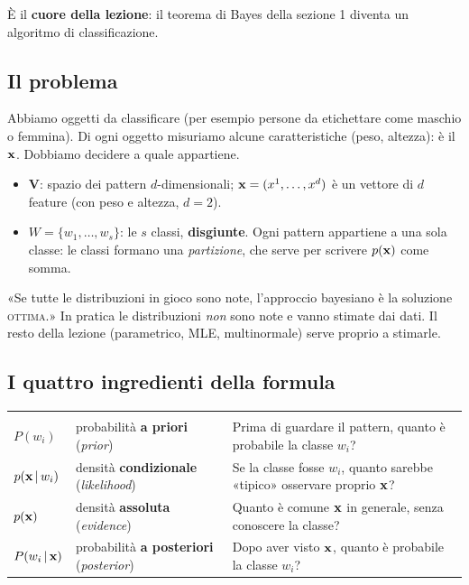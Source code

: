 
È il \textbf{cuore della lezione}: il teorema di Bayes della sezione 1 diventa un algoritmo di classificazione.

\subsection{Il problema}
\begin{intuizione}
Abbiamo oggetti da classificare (per esempio persone da etichettare come maschio o femmina). Di ogni oggetto misuriamo alcune caratteristiche (peso, altezza): è il  $\mathbf{x}$. Dobbiamo decidere a quale  appartiene.
\end{intuizione}
\begin{tecnica}
\begin{itemize}
  \item $\mathbf{V}$: spazio dei pattern $d$-dimensionali; $\mathbf{x}=(x^1,\dots,x^d)$ è un vettore di $d$ feature (con peso e altezza, $d=2$).
  \item $W=\{w_1,\dots,w_s\}$: le $s$ classi, \textbf{disgiunte}. Ogni pattern appartiene a una sola classe: le classi formano una \emph{partizione}, che serve per scrivere $p(\mathbf{x})$ come somma.
\end{itemize}
\end{tecnica}

\begin{attenzione}
«Se tutte le distribuzioni in gioco sono note, l'approccio bayesiano è la soluzione \textsc{ottima}.» In pratica le distribuzioni \emph{non} sono note e vanno stimate dai dati. Il resto della lezione (parametrico, MLE, multinormale) serve proprio a stimarle.
\end{attenzione}

\subsection{I quattro ingredienti della formula}
\begin{center}
\begin{tabularx}{\linewidth}{>{\centering\arraybackslash}m{1.6cm} >{\raggedright\arraybackslash}m{3.1cm} Y}
 &  & \\
$P(w_i)$ & probabilità \textbf{a priori} (\emph{prior}) & Prima di guardare il pattern, quanto è probabile la classe $w_i$?\\
$p(\mathbf{x}\,|\,w_i)$ & densità \textbf{condizionale} (\emph{likelihood}) & Se la classe fosse $w_i$, quanto sarebbe «tipico» osservare proprio $\mathbf{x}$?\\
$p(\mathbf{x})$ & densità \textbf{assoluta} (\emph{evidence}) & Quanto è comune $\mathbf{x}$ in generale, senza conoscere la classe?\\
$P(w_i\,|\,\mathbf{x})$ & probabilità \textbf{a posteriori} (\emph{posterior}) & Dopo aver visto $\mathbf{x}$, quanto è probabile la classe $w_i$?\\
\end{tabularx}
\end{center}

